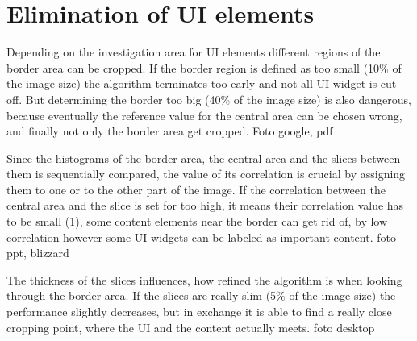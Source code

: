 \documentclass[draft,final]{vutinfth} %
\begin{document}
\section{Elimination of UI elements} 
Depending on the investigation area for UI elements different regions of the border area can be cropped. 
If the border region is defined as too small (10\% of the image size) the algorithm terminates too early and not all UI widget is cut off.
But determining the border too big (40\% of the image size) is also dangerous, because eventually the reference value for the central area can be chosen wrong, and finally not only the border area get cropped.
Foto google, pdf \par 
Since the histograms of the border area, the central area and the slices between them is sequentially compared, the value of its correlation is crucial by assigning them to one or to the other part of the image.
If the correlation between the central area and the slice is set for too high, it means their correlation value has to be small (1), some content elements near the border can get rid of, by low correlation however some UI widgets can be labeled as important content. 
foto ppt, blizzard\par 
The thickness of the slices influences, how refined the algorithm is when looking through the border area.
If the slices are really slim (5\% of the image size) the performance slightly decreases, but in exchange it is able to find a really close cropping point, where the UI and the content actually meets.
foto desktop\par
\end{document}
